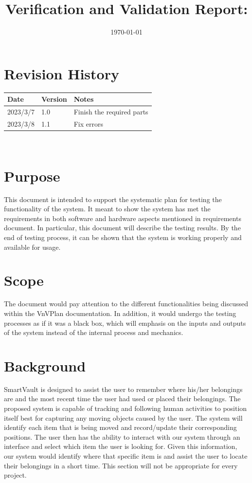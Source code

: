\documentclass[12pt, titlepage]{article}
\begin{document}
\title{Verification and Validation Report: \progname} 
\author{\authname}
\date{\today}
	
\maketitle


\section{Revision History}

\begin{tabularx}{\textwidth}{p{3cm}p{2cm}X}
\toprule {\bf Date} & {\bf Version} & {\bf Notes}\\
\midrule
2023/3/7 & 1.0 & Finish the required parts\\
2023/3/8 & 1.1 & Fix errors\\
\bottomrule
\end{tabularx}

~\newpage


\section{Purpose}
This document is intended to support the systematic plan for testing the functionality of the system. It meant to show the system has met the requirements in both software and hardware aspects mentioned in requirements document. In particular, this document will describe the testing results. By the end of testing process, it can be shown that the system is working properly and available for usage.
\section{Scope}
The document would pay attention to the different functionalities being discussed within the VnVPlan documentation. In addition, it would undergo the testing processes as if it was a black box, which will emphasis on the inputs and outputs of the system instead of the internal process and mechanics.	
\section{Background}	
SmartVault is designed to assist the user to remember where his/her belongings are and the most recent time the user had used or placed their belongings. The proposed system is capable of tracking and following human activities to position itself best for capturing any moving objects caused by the user. The system will identify each item that is being moved and record/update their corresponding positions. The user then has the ability to interact with our system through an interface and select which item the user is looking for. Given this information, our system would identify where that specific item is and assist the user to locate their belongings in a short time.
This section will not be appropriate for every project.
~\newpage
\end{document}
